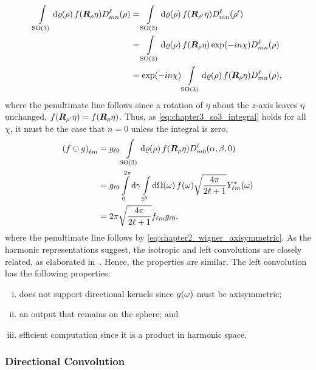 %
\begin{align}\label{eq:chapter3_so3_integral}
    \integrateRotation{\rho} f(\rotationMatrix\eta) \wigner{\ell}{m}{n}(\rho)
     & = \integrateRotation{\rho} f(\rotationMatrix[']\eta) \wigner{\ell}{m}{n}(\rho') \nonumber{}            \\
     & = \integrateRotation{\rho} f(\rotationMatrix\eta) \exp(-i n\chi) \wigner{\ell}{m}{n}(\rho) \nonumber{} \\
     & = \exp(-i n\chi) \integrateRotation{\rho} f(\rotationMatrix\eta) \wigner{\ell}{m}{n}(\rho),
\end{align}
%
where the penultimate line follows since a rotation of \({\eta}\) about the \(z\)-axis leaves \({\eta}\) unchanged, \ie{} \(f(\rotationMatrix[']\eta) = f(\rotationMatrix\eta)\).
Thus, as \cref{eq:chapter3_so3_integral} holds for all \(\chi{}\), it must be the case that \(n=0\) unless the integral is zero, \ie{}
%
\begin{align}
    \harmonic{(f \circleddash g)}
     & = \axiHarmonic{g} \integrateRotation{\rho} f(\rotationMatrix\eta) \wigner{\ell}{m}{0} (\alpha,\beta,0) \nonumber{}                                    \\
     & = \axiHarmonic{g} \int\limits_{0}^{2\pi} \dd{\gamma} \integrateSphere{\omega} \pixel{f} \sqrt{\inverseFactor} \pixel{\conj{\harmonic{Y}}} \nonumber{} \\
     & = 2\pi \sqrt{\inverseFactor} \harmonic{f} \axiHarmonic{g},
\end{align}
%
where the penultimate line follows by \cref{eq:chapter2_wigner_axisymmetric}.
As the harmonic representations suggest, the isotropic and left convolutions are closely related, as elaborated in~\cite{Kennedy2011}.
Hence, the properties are similar.
The left convolution has the following properties:
%
\begin{enumerate}[(i),nosep,left=\parindent]
    \item does not support directional kernels since \(\pixel{g}\) must be axisymmetric;
    \item an output that remains on the sphere; and
    \item efficient computation since it is a product in harmonic space.
\end{enumerate}

\subsubsection{Directional Convolution}

